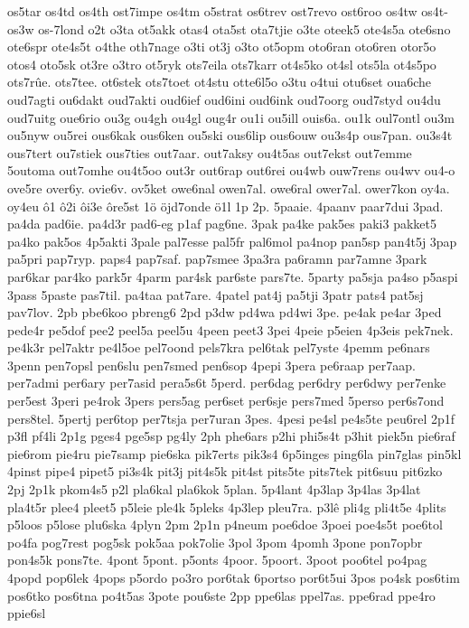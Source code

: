 os5tar
os4td
os4th
ost7impe
os4tm
o5strat
os6trev
ost7revo
ost6roo
os4tw
os4t-
os3w
os-7lond
o2t
o3ta
ot5akk
otas4
ota5st
ota7tjie
o3te
oteek5
ote4s5a
ote6sno
ote6spr
ote4s5t
o4the
oth7nage
o3ti
ot3j
o3to
ot5opm
oto6ran
oto6ren
otor5o
otos4
oto5sk
ot3re
o3tro
ot5ryk
ots7eila
ots7karr
ot4s5ko
ot4sl
ots5la
ot4s5po
ots7rûe.
ots7tee.
ot6stek
ots7toet
ot4stu
otte6l5o
o3tu
o4tui
otu6set
oua6che
oud7agti
ou6dakt
oud7akti
oud6ief
oud6ini
oud6ink
oud7oorg
oud7styd
ou4du
oud7uitg
oue6rio
ou3g
ou4gh
ou4gl
oug4r
ou1i
ou5ill
ouis6a.
ou1k
oul7ontl
ou3m
ou5nyw
ou5rei
ous6kak
ous6ken
ou5ski
ous6lip
ous6ouw
ou3s4p
ous7pan.
ou3s4t
ous7tert
ou7stiek
ous7ties
out7aar.
out7aksy
ou4t5as
out7ekst
out7emme
5outoma
out7omhe
ou4t5oo
out3r
out6rap
out6rei
ou4wb
ouw7rens
ou4wv
ou4-o
ove5re
over6y.
ovie6v.
ov5ket
owe6nal
owen7al.
owe6ral
ower7al.
ower7kon
oy4a.
oy4eu
ô1
ô2i
ôi3e
ôre5st
1ö
öjd7onde
ö1l
1p
2p.
5paaie.
4paanv
paar7dui
3pad.
pa4da
pad6ie.
pa4d3r
pad6-eg
p1af
pag6ne.
3pak
pa4ke
pak5es
paki3
pakket5
pa4ko
pak5os
4p5akti
3pale
pal7esse
pal5fr
pal6mol
pa4nop
pan5sp
pan4t5j
3pap
pa5pri
pap7ryp.
paps4
pap7saf.
pap7smee
3pa3ra
pa6ramn
par7amne
3park
par6kar
par4ko
park5r
4parm
par4sk
par6ste
pars7te.
5party
pa5sja
pa4so
p5aspi
3pass
5paste
pas7til.
pa4taa
pat7are.
4patel
pat4j
pa5tji
3patr
pats4
pat5sj
pav7lov.
2pb
pbe6koo
pbreng6
2pd
p3dw
pd4wa
pd4wi
3pe.
pe4ak
pe4ar
3ped
pede4r
pe5dof
pee2
peel5a
peel5u
4peen
peet3
3pei
4peie
p5eien
4p3eis
pek7nek.
pe4k3r
pel7aktr
pe4l5oe
pel7oond
pels7kra
pel6tak
pel7yste
4pemm
pe6nars
3penn
pen7opsl
pen6slu
pen7smed
pen6sop
4pepi
3pera
pe6raap
per7aap.
per7admi
per6ary
per7asid
pera5s6t
5perd.
per6dag
per6dry
per6dwy
per7enke
per5est
3peri
pe4rok
3pers
pers5ag
per6set
per6sje
pers7med
5perso
per6s7ond
pers8tel.
5pertj
per6top
per7tsja
per7uran
3pes.
4pesi
pe4sl
pe4s5te
peu6rel
2p1f
p3fl
pf4li
2p1g
pges4
pge5sp
pg4ly
2ph
phe6ars
p2hi
phi5s4t
p3hit
piek5n
pie6raf
pie6rom
pie4ru
pie7samp
pie6ska
pik7erts
pik3s4
6p5inges
ping6la
pin7glas
pin5kl
4pinst
pipe4
pipet5
pi3s4k
pit3j
pit4s5k
pit4st
pits5te
pits7tek
pit6suu
pit6zko
2pj
2p1k
pkom4s5
p2l
pla6kal
pla6kok
5plan.
5p4lant
4p3lap
3p4las
3p4lat
pla4t5r
plee4
pleet5
p5leie
ple4k
5pleks
4p3lep
pleu7ra.
p3lê
pli4g
pli4t5e
4plits
p5loos
p5lose
plu6ska
4plyn
2pm
2p1n
p4neum
poe6doe
3poei
poe4s5t
poe6tol
po4fa
pog7rest
pog5sk
pok5aa
pok7olie
3pol
3pom
4pomh
3pone
pon7opbr
pon4s5k
pons7te.
4pont
5pont.
p5onts
4poor.
5poort.
3poot
poo6tel
po4pag
4popd
pop6lek
4pops
p5ordo
po3ro
por6tak
6portso
por6t5ui
3pos
po4sk
pos6tim
pos6tko
pos6tna
po4t5as
3pote
pou6ste
2pp
ppe6las
ppel7as.
ppe6rad
ppe4ro
ppie6sl
